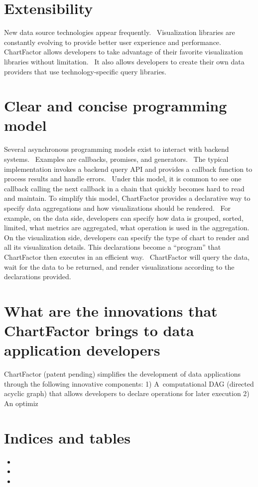 \documentclass[letterpaper,10pt,english]{sphinxmanual}
\begin{document}
\chapter{Extensibility}
\label{\detokenize{index:extensibility}}
New data source technologies appear frequently.  Visualization libraries are constantly evolving to provide better user experience and performance.  ChartFactor allows developers to take advantage of their favorite visualization libraries without limitation.  It also allows developers to create their own data providers that use technology-specific query libraries.


\chapter{Clear and concise programming model}
\label{\detokenize{index:clear-and-concise-programming-model}}
Several asynchronous programming models exist to interact with backend systems.  Examples are callbacks, promises, and generators.  The typical implementation invokes a backend query API and provides a callback function to process results and handle errors.  Under this model, it is common to see one callback calling the next callback in a chain that quickly becomes hard to read and maintain.
To simplify this model, ChartFactor provides a declarative way to specify data aggregations and how visualizations should be rendered.  For example, on the data side, developers can specify how data is grouped, sorted, limited, what metrics are aggregated, what operation is used in the aggregation.  On the visualization side, developers can specify the type of chart to render and all its visualization details.
This declarations become a “program” that ChartFactor then executes in an efficient way.  ChartFactor will query the data, wait for the data to be returned, and render visualizations according to the declarations provided.


\chapter{What are the innovations that ChartFactor brings to data application developers}
\label{\detokenize{index:what-are-the-innovations-that-chartfactor-brings-to-data-application-developers}}
ChartFactor (patent pending) simplifies the development of data applications through the following innovative components:
1) A computational DAG (directed acyclic graph) that allows developers to declare operations for later execution
2) An optimiz


\chapter{Indices and tables}
\label{\detokenize{index:indices-and-tables}}\begin{itemize}
\item {} 

\item {} 

\item {} 

\end{itemize}



\renewcommand{\indexname}{Index}
\printindex
\end{document}
